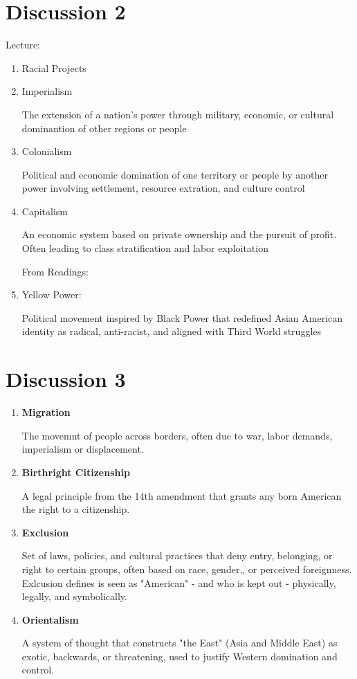 \documentclass{article}
\begin{document}
    \section*{Discussion 2}
      Lecture:
    \begin{enumerate}
      \item Racial Projects
      \item Imperialism

        The extension of a nation's power through military, economic, or cultural
        dominantion of other regions or people

      \item Colonialism

        Political and economic domination of one territory or people
        by another power involving settlement, resource extration, and culture control

      \item Capitalism

        An economic system based on private ownership and the pursuit of profit.
        Often leading to class stratification and labor exploitation

        From Readings:
      \item Yellow Power:

        Political movement inspired by Black Power that redefined
        Asian American identity as radical, anti-racist, and aligned with
        Third World struggles


    \end{enumerate}

  \section*{Discussion 3}
  \begin{enumerate}
    \item \textbf{Migration} 

      The movemnt of people across borders, often due to war, labor demands,
      imperialism or displacement.

    \item \textbf{Birthright Citizenship}

      A legal principle from the 14th amendment that grants any born American the right to a citizenship.

    \item \textbf{Exclusion}

      Set of laws, policies, and cultural practices that deny entry, belonging,
      or right to certain groups, often based on race, gender,, or perceived foreignness.
      Exlcusion defines is seen as "American" - and who is kept out
      - physically, legally, and symbolically.

    \item \textbf{Orientalism}

      A system of thought that constructs "the East" (Asia and Middle East) as exotic, backwards,
      or threatening, used to justify Western domination and control. 

  \end{enumerate}
\end{document}
